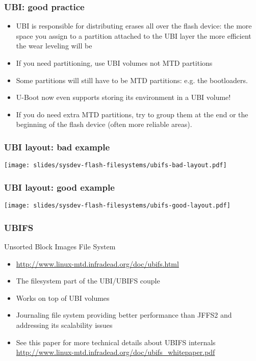 \begin{frame}
  \frametitle{UBI: good practice}
  \begin{itemize}
  \item UBI is responsible for distributing erases all over the flash
    device: the more space you assign to a partition attached to the
    UBI layer the more efficient the wear leveling will be
  \item If you need partitioning, use UBI volumes not MTD partitions
  \item Some partitions will still have to be MTD partitions: e.g. the
    bootloaders.
  \item U-Boot now even supports storing its environment in a UBI volume!
  \item If you do need extra MTD partitions, try to group them at the end
    or the beginning of the flash device (often more reliable areas).
  \end{itemize}
\end{frame}

\begin{frame}
  \frametitle{UBI layout: bad example}
  \begin{center}
    \texttt{[image: slides/sysdev-flash-filesystems/ubifs-bad-layout.pdf]}
  \end{center}
\end{frame}

\begin{frame}
  \frametitle{UBI layout: good example}
  \begin{center}
    \texttt{[image: slides/sysdev-flash-filesystems/ubifs-good-layout.pdf]}
  \end{center}
\end{frame}

\begin{frame}
  \frametitle{UBIFS}
  Unsorted Block Images File System
  \begin{itemize}
  \item \url{http://www.linux-mtd.infradead.org/doc/ubifs.html}
  \item The filesystem part of the UBI/UBIFS couple
  \item Works on top of UBI volumes
  \item Journaling file system providing better performance than
    JFFS2 and addressing its scalability issues
  \item See this paper for more technical details about UBIFS internals
    \url{http://www.linux-mtd.infradead.org/doc/ubifs_whitepaper.pdf}
  \end{itemize}
\end{frame}

